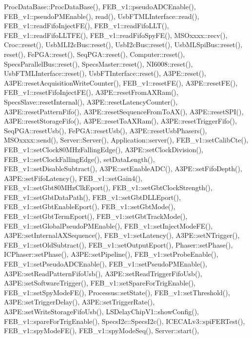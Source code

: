 Proc\+Data\+Base\+::\+Proc\+Data\+Base(), F\+E\+B\+\_\+v1\+::pseudo\+A\+D\+C\+Enable(), F\+E\+B\+\_\+v1\+::pseudo\+P\+M\+Enable(), read(), Usb\+F\+T\+M\+L\+Interface\+::read(), F\+E\+B\+\_\+v1\+::read\+Fifo\+Inject\+F\+E(), F\+E\+B\+\_\+v1\+::read\+Fifo\+L\+L\+T(), F\+E\+B\+\_\+v1\+::read\+Fifo\+L\+L\+T\+F\+E(), F\+E\+B\+\_\+v1\+::read\+Fifo\+Spy\+F\+E(), M\+S\+Oxxxx\+::recv(), Croc\+::reset(), Usb\+M\+L\+I2c\+Bus\+::reset(), Usb\+I2c\+Bus\+::reset(), Usb\+M\+L\+Spi\+Bus\+::reset(), reset(), Fe\+P\+G\+A\+::reset(), Seq\+P\+G\+A\+::reset(), Computer\+::reset(), Specs\+Parallel\+Bus\+::reset(), Specs\+Master\+::reset(), N\+I6008\+::reset(), Usb\+F\+T\+M\+L\+Interface\+::reset(), Usb\+F\+T\+Interface\+::reset(), A3\+P\+E\+::reset(), A3\+P\+E\+::reset\+Acquisition\+Write\+Counter(), F\+E\+B\+\_\+v1\+::reset\+F\+E(), A3\+P\+E\+::reset\+F\+E(), F\+E\+B\+\_\+v1\+::reset\+Fifo\+Inject\+F\+E(), A3\+P\+E\+::reset\+From\+A\+X\+Ram(), Specs\+Slave\+::reset\+Internal(), A3\+P\+E\+::reset\+Latency\+Counter(), A3\+P\+E\+::reset\+Pattern\+Fifo(), A3\+P\+E\+::reset\+Sequence\+From\+To\+A\+X(), A3\+P\+E\+::reset\+S\+P\+I(), A3\+P\+E\+::reset\+Storage\+Fifo(), A3\+P\+E\+::reset\+To\+A\+X\+Ram(), A3\+P\+E\+::reset\+Trigger\+Fifo(), Seq\+P\+G\+A\+::reset\+Usb(), Fe\+P\+G\+A\+::reset\+Usb(), A3\+P\+E\+::reset\+Usb\+Phasers(), M\+S\+Oxxxx\+::send(), Server\+::\+Server(), Application\+::server(), F\+E\+B\+\_\+v1\+::set\+Calib\+Cte(), F\+E\+B\+\_\+v1\+::set\+Clock80\+M\+Hz\+Falling\+Edge(), A3\+P\+E\+::set\+Clock\+Division(), F\+E\+B\+\_\+v1\+::set\+Clock\+Falling\+Edge(), set\+Data\+Length(), F\+E\+B\+\_\+v1\+::set\+Disable\+Subtract(), A3\+P\+E\+::set\+Enable\+A\+D\+C(), A3\+P\+E\+::set\+Fifo\+Depth(), A3\+P\+E\+::set\+Fifo\+Latency(), F\+E\+B\+\_\+v1\+::set\+Gain4(), F\+E\+B\+\_\+v1\+::set\+Gbt80\+M\+Hz\+Clk\+Eport(), F\+E\+B\+\_\+v1\+::set\+Gbt\+Clock\+Strength(), F\+E\+B\+\_\+v1\+::set\+Gbt\+Data\+Path(), F\+E\+B\+\_\+v1\+::set\+Gbt\+D\+L\+L\+Eport(), F\+E\+B\+\_\+v1\+::set\+Gbt\+Enable\+Eport(), F\+E\+B\+\_\+v1\+::set\+Gbt\+Mode(), F\+E\+B\+\_\+v1\+::set\+Gbt\+Term\+Eport(), F\+E\+B\+\_\+v1\+::set\+Gbt\+Track\+Mode(), F\+E\+B\+\_\+v1\+::set\+Global\+Pseudo\+P\+M\+Enable(), F\+E\+B\+\_\+v1\+::set\+Inject\+Mode\+F\+E(), A3\+P\+E\+::set\+Internal\+A\+X\+Sequence(), F\+E\+B\+\_\+v1\+::set\+Latency(), A3\+P\+E\+::set\+N\+Trigger(), F\+E\+B\+\_\+v1\+::set\+Old\+Subtract(), F\+E\+B\+\_\+v1\+::set\+Output\+Eport(), Phaser\+::set\+Phase(), I\+C\+Phaser\+::set\+Phase(), A3\+P\+E\+::set\+Pipeline(), F\+E\+B\+\_\+v1\+::set\+Probe\+Enable(), F\+E\+B\+\_\+v1\+::set\+Pseudo\+A\+D\+C\+Enable(), F\+E\+B\+\_\+v1\+::set\+Pseudo\+P\+M\+Enable(), A3\+P\+E\+::set\+Read\+Pattern\+Fifo\+Usb(), A3\+P\+E\+::set\+Read\+Trigger\+Fifo\+Usb(), A3\+P\+E\+::set\+Software\+Trigger(), F\+E\+B\+\_\+v1\+::set\+Spare\+For\+Trig\+Enable(), F\+E\+B\+\_\+v1\+::set\+Spy\+Mode\+F\+E(), Processus\+::set\+State(), F\+E\+B\+\_\+v1\+::set\+Threshold(), A3\+P\+E\+::set\+Trigger\+Delay(), A3\+P\+E\+::set\+Trigger\+Rate(), A3\+P\+E\+::set\+Write\+Storage\+Fifo\+Usb(), L\+S\+Delay\+Chip\+V1\+::show\+Config(), F\+E\+B\+\_\+v1\+::spare\+For\+Trig\+Enable(), Specs\+I2c\+::\+Specs\+I2c(), I\+C\+E\+C\+A\+Lv3\+::spi\+F\+E\+R\+Test(), F\+E\+B\+\_\+v1\+::spy\+Mode\+F\+E(), F\+E\+B\+\_\+v1\+::spy\+Mode\+Seq(), Server\+::start(), 